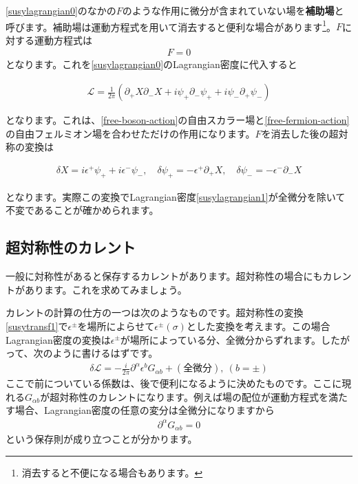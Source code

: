 \documentclass[report,paper=a4, fontsize=12pt, line_length=16cm, number_of_lines=33,dvipdfmx]{jlreq}
\newenvironment{important}{\begin{tcolorbox}[
  colback = white,
  colframe = red!35,
  boxrule = 2mm,
  fonttitle = \bfseries,
  after = \noindent] }{\end{tcolorbox}}
\numberwithin{equation}{chapter}
\numberwithin{equation}{section}
\newcommand{\del}{\partial}
\newcommand{\kyou}[1]{{\sffamily \bfseries #1}}
\newcommand{\Lcal}{\mathcal{L}}
\begin{document}
\eqref{susylagrangian0}のなかの$F$のような作用に微分が含まれていない場を\kyou{補助場}と呼びます。補助場は運動方程式を用いて消去すると便利な場合があります\footnote{消去すると不便になる場合もあります。}。$F$に対する運動方程式は
\begin{align}
  F=0
\end{align}
となります。これを\eqref{susylagrangian0}のLagrangian密度に代入すると
\begin{important}
\begin{align}
  \Lcal=\frac{1}{2\pi}\left( 
    \del_{+}X\del_{-}X+i\psi_{+}\del_{-}\psi_{+}+i\psi_{-}\del_{+}\psi_{-}
   \right)\label{susylagrangian1}
\end{align}
\end{important}
となります。これは、\eqref{free-boson-action}の自由スカラー場と\eqref{free-fermion-action}の自由フェルミオン場を合わせただけの作用になります。$F$を消去した後の超対称の変換は
\begin{important}
  \begin{align}
  \delta X=i\epsilon^{+}\psi_{+}+i\epsilon^{-}\psi_{-} ,\quad
  \delta \psi_{+}=-\epsilon^{+}\del_{+}X,\quad
  \delta \psi_{-}=-\epsilon^{-}\del_{-}X
  \label{susytransf1}
\end{align}
\end{important}
となります。実際この変換でLagrangian密度\eqref{susylagrangian1}が全微分を除いて不変であることが確かめられます。

\subsection{超対称性のカレント}
一般に対称性があると保存するカレントがあります。超対称性の場合にもカレントがあります。これを求めてみましょう。

カレントの計算の仕方の一つは次のようなものです。超対称性の変換\eqref{susytransf1}で$\epsilon^{\pm}$を場所によらせて$\epsilon^{\pm}(\sigma)$とした変換を考えます。この場合Lagrangian密度の変換は$\epsilon^{\pm}$が場所によっている分、全微分からずれます。したがって、次のように書けるはずです。
\begin{align}
  \delta \Lcal =-\frac{i}{2\pi}\del^{\alpha}\epsilon^{b}G_{\alpha b}+(\text{全微分}),\ (b=\pm)
\end{align}
ここで前についている係数は、後で便利になるように決めたものです。ここに現れる$G_{\alpha b}$が超対称性のカレントになります。例えば場の配位が運動方程式を満たす場合、Lagrangian密度の任意の変分は全微分になりますから
\begin{align}
  \del^{\alpha}G_{\alpha b}=0
\end{align}
という保存則が成り立つことが分かります。
\end{document}

